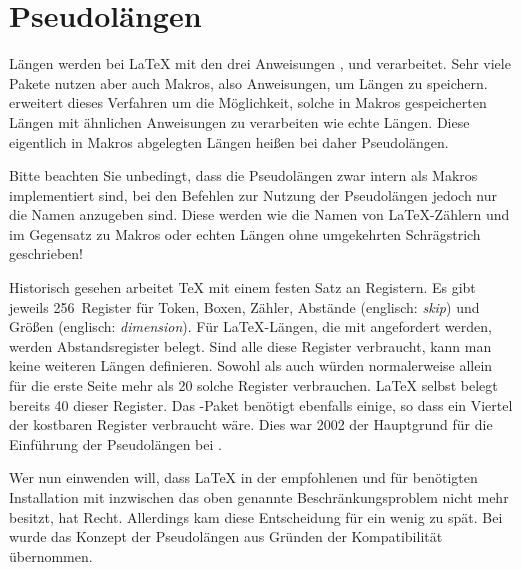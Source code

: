 \section{Pseudolängen}
\BeginIndexGroup
{}

Längen werden bei \LaTeX{} mit den drei Anweisungen
, 
und  verarbeitet. Sehr viele Pakete
nutzen aber auch Makros, also Anweisungen, um Längen zu
speichern. \KOMAScript{} erweitert dieses Verfahren um die Möglichkeit, solche
in Makros gespeicherten Längen mit ähnlichen Anweisungen zu verarbeiten wie
echte Längen. Diese eigentlich in Makros abgelegten Längen heißen bei
\KOMAScript{} daher Pseudolängen.

Bitte beachten Sie unbedingt, dass die Pseudolängen zwar
intern als Makros implementiert sind, bei den Befehlen zur Nutzung der
Pseudolängen jedoch nur die Namen anzugeben sind. Diese werden wie die Namen
von \LaTeX-Zählern und im Gegensatz zu Makros oder echten Längen ohne
umgekehrten Schrägstrich geschrieben!

\begin{Explain}
  Historisch gesehen arbeitet \TeX{} mit einem festen Satz an Registern. Es
  gibt jeweils 256~Register für Token, Boxen, Zähler, Abstände (englisch:
  \emph{skip}) und Größen (englisch: \emph{dimension}). Für \LaTeX{}-Längen,
  die mit  angefordert werden, werden Abstandsregister
  belegt. Sind alle diese Register verbraucht, kann man keine weiteren Längen
  definieren. Sowohl  als auch  würden
  normalerweise allein für die erste Seite mehr als 20 solche Register
  verbrauchen. \LaTeX{} selbst belegt bereits 40 dieser Register. Das
  \hyperref[cha:typearea]{}%
  -Paket benötigt ebenfalls einige, so dass ein Viertel
  der kostbaren Register verbraucht wäre. Dies war 2002 der Hauptgrund für die
  Einführung der Pseudolängen bei .

  Wer nun einwenden will, dass \LaTeX{} in der empfohlenen und für
  \KOMAScript{} benötigten Installation mit \eTeX{} inzwischen das oben
  genannte Beschränkungsproblem nicht mehr besitzt, hat Recht. Allerdings kam
  diese Entscheidung für  ein wenig zu spät. Bei
   wurde das Konzept der Pseudolängen aus Gründen der
  Kompatibilität übernommen.
\end{Explain}

